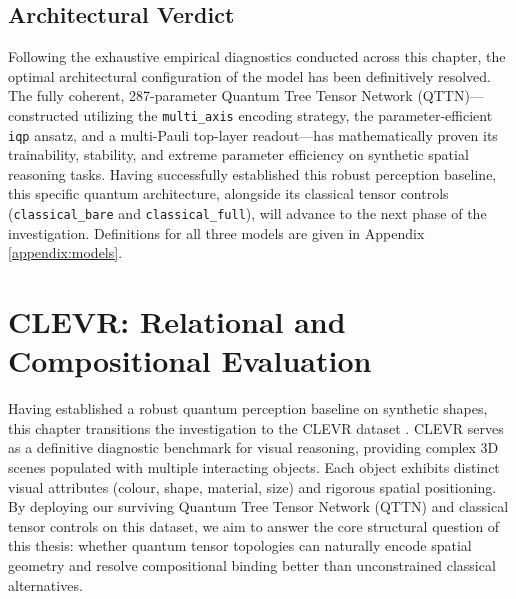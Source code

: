 \documentclass[12pt, a4paper, oneside]{report}
\begin{document}
\section{Architectural Verdict}

Following the exhaustive empirical diagnostics conducted across this chapter, the optimal architectural configuration of the model has been definitively resolved. 
The fully coherent, 287-parameter Quantum Tree Tensor Network (QTTN)—constructed utilizing the \texttt{multi\_axis} encoding strategy, the parameter-efficient \texttt{iqp} ansatz, and a multi-Pauli top-layer readout—has mathematically proven its trainability, stability, and extreme parameter efficiency on synthetic spatial reasoning tasks. 
Having successfully established this robust perception baseline, this specific quantum architecture, alongside its classical tensor controls (\texttt{classical\_bare} and \texttt{classical\_full}), will advance to the next phase of the investigation. Definitions for all three models are given in Appendix \ref{appendix:models}.



\chapter{CLEVR: Relational and Compositional Evaluation}
\label{ch:clevr}

Having established a robust quantum perception baseline on synthetic shapes, this chapter transitions the investigation to the CLEVR dataset \cite{johnson2017clevr}. CLEVR serves as a definitive diagnostic benchmark for visual reasoning, providing complex 3D scenes populated with multiple interacting objects. Each object exhibits distinct visual attributes (colour, shape, material, size) and rigorous spatial positioning. By deploying our surviving Quantum Tree Tensor Network (QTTN) and classical tensor controls on this dataset, we aim to answer the core structural question of this thesis: whether quantum tensor topologies can naturally encode spatial geometry and resolve compositional binding better than unconstrained classical alternatives.
\end{document}
